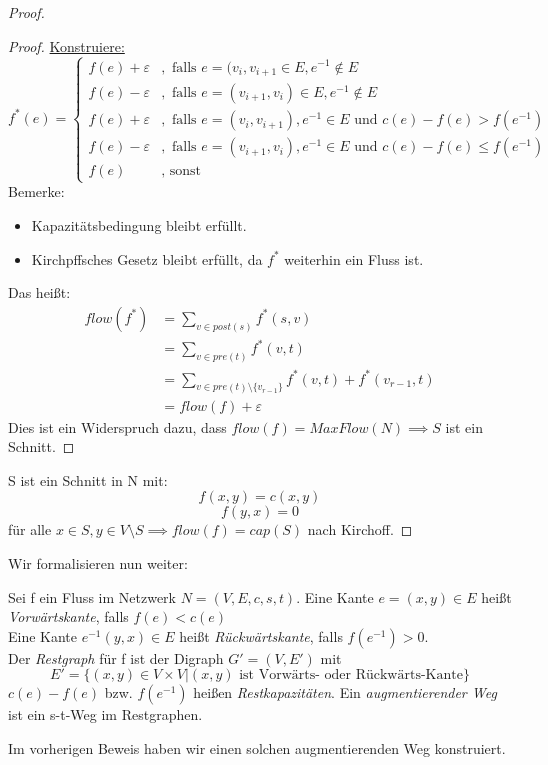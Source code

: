 \begin{proof}
\begin{proof}
\underline{Konstruiere:}
\[
f^{*}(e)= \begin{cases}
	f(e)+\varepsilon &, \text{ falls } e=(v_i, v_{i+1} \in E, e^{-1}\not\in E \\
	f(e)-\varepsilon &, \text{ falls } e = (v_{i+1}, v_i) \in E, e^{-1}\not\in E \\
	f(e)+\varepsilon &, \text{ falls } e=(v_i, v_{i+1}), e^{-1} \in E \text{ und } c(e)-f(e) > f(e^{-1}) \\
	f(e)-\varepsilon &, \text{ falls } e=(v_{i+1}, v_i), e^{-1} \in E \text{ und } c(e)-f(e) \le f(e^{-1}) \\
	f(e) &, \text{ sonst}
\end{cases}
\]
Bemerke:
\begin{itemize}
	\item Kapazitätsbedingung bleibt erfüllt.
	\item Kirchpffsches Gesetz bleibt erfüllt, da $f^{*}$ weiterhin ein Fluss ist.
\end{itemize}
Das heißt:
\begin{align*}
	flow(f^{*}) &= \sum_{v \in post(s)} f^{*}(s,v) \\
		    &= \sum_{v \in pre(t)} f^{*}(v,t) \\
		    &= \sum_{v \in pre(t) \setminus \{v_{r-1}\} } f^{*}(v,t) + f^{*}(v_{r-1},t) \\
		    &=flow(f) +\varepsilon
\end{align*}
Dies ist ein Widerspruch dazu, dass $flow(f) = MaxFlow(N) \implies S$ ist ein Schnitt.
\end{proof}
S ist ein Schnitt in N mit:
\[
f(x,y)=c(x,y) 
\]
\[
	f(y,x)=0
\]
für alle $x \in S, y \in V \setminus S \implies flow(f)=cap(S)$ nach Kirchoff. 
\end{proof}
Wir formalisieren nun weiter:
\begin{definition}
Sei f ein Fluss im Netzwerk $N=(V,E,c,s,t)$. Eine Kante $e=(x,y) \in E$  heißt \emph{Vorwärtskante}, falls $f(e)<c(e)$ \\
Eine Kante $e^{-1}(y,x) \in E$ heißt \emph{Rückwärtskante}, falls $f(e^{-1}) > 0$. \\
Der \emph{Restgraph} für f ist der Digraph $G'=(V,E')$ mit
\[
E'=\{(x,y) \in V \times V | (x,y) \text{ ist Vorwärts- oder Rückwärts-Kante}\} 
\]
$c(e)-f(e)$ bzw. $f(e^{-1})$ heißen \emph{Restkapazitäten}. Ein \emph{augmentierender Weg} ist ein s-t-Weg im Restgraphen.
\end{definition}
Im vorherigen Beweis haben wir einen solchen augmentierenden Weg konstruiert.

